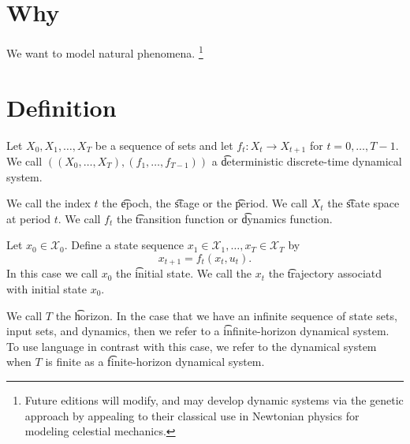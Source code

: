 
\section*{Why}

We want to model natural phenomena.
  \ifhmode\unskip\fi\footnote{
Future editions will modify, and may develop dynamic systems via the genetic approach by appealing to their classical use in Newtonian physics for modeling celestial mechanics.
  }

\section*{Definition}

Let $X_0, X_1, \dots , X_T$ be a sequence of sets and let $f_t: X_t \to X_{t+1}$ for $t = 0, \dots , T-1$.
We call $((X_0, \dots , X_T), (f_1, \dots , f_{T-1}))$ a \t{deterministic discrete-time dynamical system}.

We call the index $t$ the \t{epoch}, the \t{stage} or the \t{period}.
We call $X_t$ the \t{state space} at period $t$.
We call $f_t$ the \t{transition function} or \t{dynamics function}.

Let $x_0 \in \mathcal{X} _0$. Define a state sequence $x_1 \in \mathcal{X} _1, \dots , x_T \in \mathcal{X} _T$ by
  \[
x_{t+1} = f_t(x_t, u_t).
  \]
In this case we call $x_0$ the \t{initial state}.
We call the $x_t$ the \t{trajectory} associatd with initial state $x_0$.

We call $T$ the \t{horizon}.
In the case that we have an infinite sequence of state sets, input sets, and dynamics, then we refer to a \t{infinite-horizon} dynamical system.
To use language in contrast with this case, we refer to the dynamical system when $T$ is finite as a \t{finite-horizon} dynamical system.

\blankpage